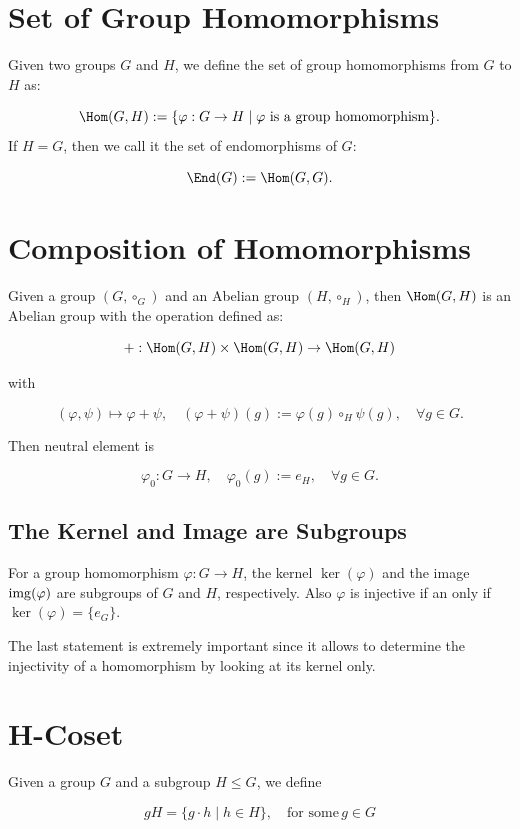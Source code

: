 \section{Set of Group Homomorphisms}

Given two groups \(G\) and \(H\), we define the set of group homomorphisms from \(G\) to \(H\) as:

\[
	\Hom(G, H) := \{\varphi: G \to H \mid \varphi \text{ is a group homomorphism}\}.
\]
If \(H = G\), then we call it the set of endomorphisms of \(G\):

\[
	\End(G) := \Hom(G, G).
\]

\section{Composition of Homomorphisms}

Given a group \((G, \circ_G)\) and an Abelian group \((H, \circ_H)\), then \(\Hom(G, H)\) is an Abelian group with the operation defined as:

\[
	+: \Hom(G, H) \times \Hom(G, H) \to \Hom(G, H)
\]

with

\[
	(\varphi, \psi) \mapsto \varphi + \psi, \quad (\varphi + \psi)(g) := \varphi(g) \circ_H \psi(g), \quad \forall g \in G.
\]

Then neutral element is

\[
	\varphi_0: G \to H, \quad \varphi_0(g) := e_H, \quad \forall g \in G.
\]

\subsection{The Kernel and Image are Subgroups}

For a group homomorphism \(\varphi: G \to H\), the kernel \(\ker(\varphi)\) and the image \(\mathrm{img}(\varphi)\) are subgroups of \(G\) and \(H\), respectively.
Also \(\varphi\) is injective if an only if \(\ker(\varphi) = \{e_G\}\).

The last statement is extremely important since it allows to determine the injectivity of a homomorphism by looking at its kernel only.

\section{H-Coset}

Given a group \(G\) and a subgroup \(H \leq G\), we define

\[
	gH = \{g \cdot h \mid h \in H\}, \quad \text{for some}\, g \in G
\]

